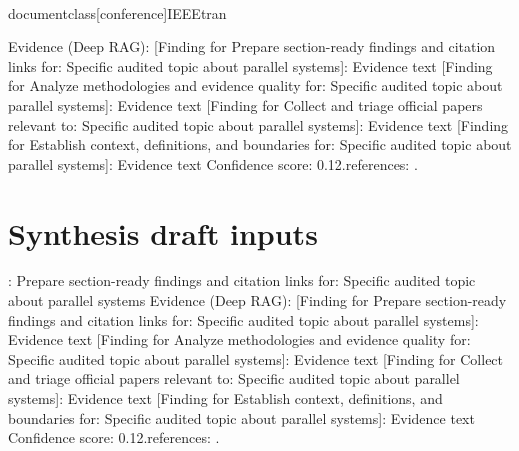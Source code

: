\\documentclass[conference]{IEEEtran}
\begin{document}
Evidence (Deep RAG):
[Finding for Prepare section-ready findings and citation links for: Specific audited topic about parallel systems]: Evidence text
[Finding for Analyze methodologies and evidence quality for: Specific audited topic about parallel systems]: Evidence text
[Finding for Collect and triage official papers relevant to: Specific audited topic about parallel systems]: Evidence text
[Finding for Establish context, definitions, and boundaries for: Specific audited topic about parallel systems]: Evidence text
Confidence score: 0.12.\nSupporting references: \cite{t1_mock_1,t2_mock_1,t3_mock_1,t4_mock_1}.\n\n\section{Synthesis draft inputs}\nObjective: Prepare section-ready findings and citation links for: Specific audited topic about parallel systems
Evidence (Deep RAG):
[Finding for Prepare section-ready findings and citation links for: Specific audited topic about parallel systems]: Evidence text
[Finding for Analyze methodologies and evidence quality for: Specific audited topic about parallel systems]: Evidence text
[Finding for Collect and triage official papers relevant to: Specific audited topic about parallel systems]: Evidence text
[Finding for Establish context, definitions, and boundaries for: Specific audited topic about parallel systems]: Evidence text
Confidence score: 0.12.\nSupporting references: \cite{t1_mock_1,t2_mock_1,t3_mock_1,t4_mock_1}.

\
\

\
\end{document}
